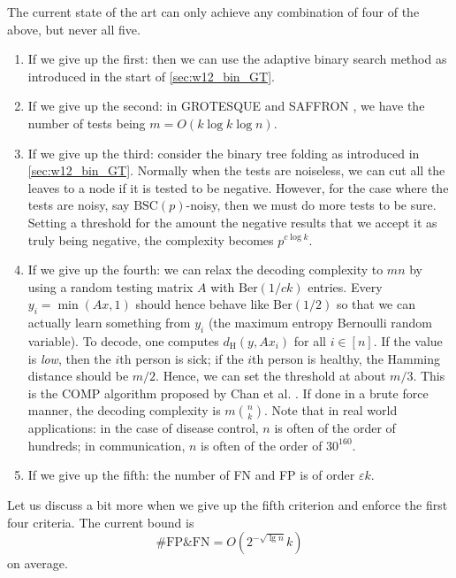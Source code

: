 The current state of the art can only achieve any combination of four of the above, but never all five.
\begin{enumerate}
    \item If we give up the first: then we can use the adaptive binary search method as introduced in the start of \autoref{sec:w12_bin_GT}.
    
    \item If we give up the second: in GROTESQUE \cite{grotesque_GT} and SAFFRON \cite{saffron_GT}, we have the number of tests being $m=O(k\log k\log n)$.
    
    \item If we give up the third: consider the binary tree folding as introduced in \autoref{sec:w12_bin_GT}. Normally when the tests are noiseless, we can cut all the leaves to a node if it is tested to be negative. However, for the case where the tests are noisy, say $\mathrm{BSC}(p)$-noisy, then we must do more tests to be sure. Setting a threshold for the amount the negative results that we accept it as truly being negative, the complexity becomes $p^{c\log k}$.
    
    \item If we give up the fourth: we can relax the decoding complexity to $mn$ by using a random testing matrix $A$ with $\mathrm{Ber}(1/ck)$ entries. Every $y_i=\min(Ax,1)$ should hence behave like $\mathrm{Ber}(1/2)$ so that we can actually learn something from $y_i$ (the maximum entropy Bernoulli random variable). To decode, one computes $d_\mathrm{H}(y,Ax_i)$ for all $i\in[n]$. If the value is \textit{low}, then the $i$th person is sick; if the $i$th person is healthy, the Hamming distance should be $m/2$. Hence, we can set the threshold at about $m/3$. This is the COMP algorithm proposed by Chan et al. \cite{COMP_GT}. If done in a brute force manner, the decoding complexity is $m\binom{n}{k}$. Note that in real world applications: in the case of disease control, $n$ is often of the order of hundreds; in communication, $n$ is often of the order of $30^{160}$.

    \item If we give up the fifth: the number of FN and FP is of order $\varepsilon k$.    
\end{enumerate}
Let us discuss a bit more when we give up the fifth criterion and enforce the first four criteria. The current bound is
\begin{equation}
    \#\mathrm{FP \& FN} = O\left(2^{-\sqrt{\lg n}}k\right)
\end{equation}
on average.

